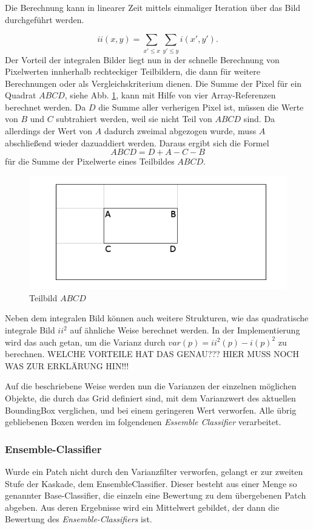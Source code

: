 	Die Berechnung kann in linearer Zeit mittels einmaliger Iteration über das Bild durchgeführt werden.

	$$ ii(x,y)=\underset{x'\leq x}{\sum}\underset{y'\leq y}{\sum}i(x',y'). $$
	Der Vorteil der integralen Bilder liegt nun in der schnelle Berechnung von Pixelwerten innherhalb rechteckiger Teilbildern, die dann für weitere Berechnungen oder als Vergleichskriterium dienen. Die Summe der Pixel für ein Quadrat $ABCD$, siehe Abb. \ref{Subwindow}, kann mit Hilfe von vier Array-Referenzen berechnet werden. Da $D$ die Summe aller verherigen Pixel ist, müssen die Werte von $B$ und $C$ subtrahiert werden, weil sie nicht Teil von $ABCD$ sind. Da allerdings der Wert von $A$ dadurch zweimal abgezogen wurde, muss $A$ abschließend wieder dazuaddiert werden. Daraus ergibt sich die Formel $$ABCD=D+A-C-B$$ für die Summe der Pixelwerte eines Teilbildes $ABCD$.

	\begin{figure}
	\centering{}\includegraphics[scale=0.7]{../pictures/IntegralImage.png}\caption{Teilbild $ABCD$}
	\label{Subwindow}
	\end{figure}

	Neben dem integralen Bild können auch weitere Strukturen, wie das quadratische integrale Bild $ii^{2}$ auf ähnliche Weise berechnet werden. In der Implementierung wird das auch getan, um die Varianz durch $var(p)=ii^{2}(p)-i(p)^{2}$ zu berechnen. WELCHE VORTEILE HAT DAS GENAU??? HIER MUSS NOCH WAS ZUR ERKLÄRUNG HIN!!!

	Auf die beschriebene Weise werden nun die Varianzen der einzelnen möglichen Objekte, die durch das Grid definiert sind, mit dem Varianzwert des aktuellen BoundingBox verglichen, und bei einem geringeren Wert verworfen. Alle übrig gebliebenen Boxen werden im folgendenen \textit{Essemble Classifier} verarbeitet.

	\subsubsection{Ensemble-Classifier}
	Wurde ein Patch nicht durch den Varianzfilter verworfen, gelangt er zur zweiten Stufe der Kaskade, dem EnsembleClassifier. Dieser besteht aus einer Menge so genannter Base-Classifier, die einzeln eine Bewertung zu dem übergebenen Patch abgeben. Aus deren Ergebnisse wird ein Mittelwert gebildet, der dann die Bewertung des \textit{Ensemble-Classifiers} ist.

